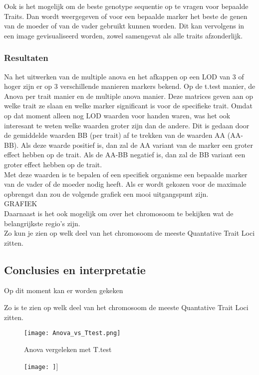 \documentclass[12pt,a4paper, twocolumn]{article}
\begin{document}
Ook is het mogelijk om de beste genotype sequentie op te vragen voor bepaalde Traits.
Dan wordt weergegeven of voor een bepaalde marker het beste de genen van de moeder of van de vader gebruikt kunnen worden.
Dit kan vervolgens  in een image gevisualiseerd worden, zowel samengevat als alle traits afzonderlijk.


\subsubsection*{Resultaten}
Na het uitwerken van de multiple anova en het afkappen op een LOD van 3 of hoger zijn er op 3 verschillende manieren markers bekend. 
Op de t.test manier, de Anova per trait manier en de multiple anova manier. 
Deze matrices geven aan op welke trait ze slaan en welke marker significant is voor de specifieke trait.
Omdat  op dat moment alleen nog LOD waarden voor handen waren, was het ook interesant te weten welke waarden groter zijn dan de andere. 
Dit is gedaan door de gemiddelde waarden BB (per trait) af te trekken van de waarden AA (AA-BB).
Als deze waarde positief is, dan zal de AA variant van de marker een groter effect hebben op de trait. 
Als de AA-BB negatief is, dan zal de BB variant een groter effect hebben op de trait. \\
Met deze waarden is te bepalen of een specifiek organisme een bepaalde marker van de vader of de moeder nodig heeft.
Als er wordt gekozen voor de maximale opbrengst dan zou de volgende grafiek een mooi uitgangspunt zijn.\\
GRAFIEK\\
Daarnaast is het ook mogelijk om over het chromosoom te bekijken wat de belangrijkste regio's zijn.\\
Zo kun je zien op welk deel van het chromosoom de meeste Quantative Trait Loci zitten.
\subsection*{Conclusies en interpretatie}
Op dit moment kan er worden gekeken 


Zo is te zien op welk deel van het chromosoom de meeste Quantative Trait Loci zitten.
\listoffigures
\begin{figure}
\hspace{-1.5cm}
\texttt{[image: Anova\_vs\_Ttest.png]}
\caption{Anova vergeleken met T.test}
\end{figure}
\begin{figure}
\vspace{2ex}
\hspace{-1.5ex}
\texttt{[image: ]}]
\end{figure}
\end{document}
